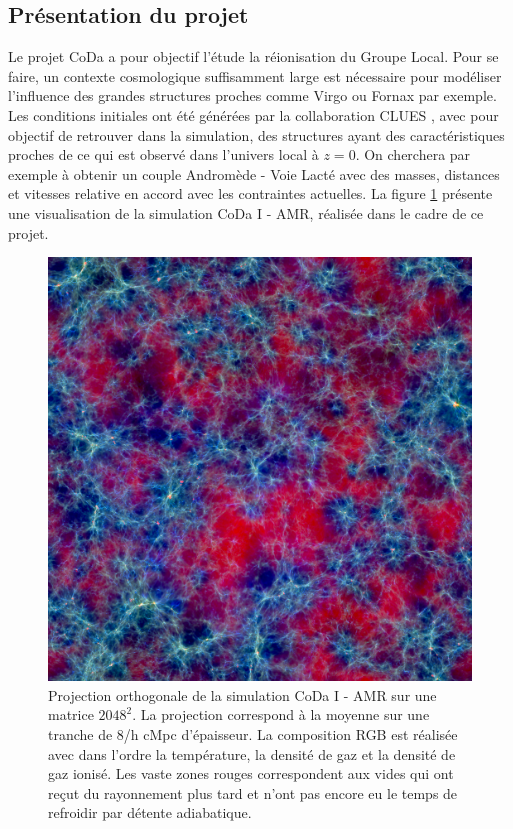 \subsection{Présentation du projet}

Le projet \ac{CoDa} a pour objectif l’étude la réionisation du Groupe Local. %
Pour se faire, un contexte cosmologique suffisamment large est nécessaire pour modéliser l'influence des grandes structures proches comme Virgo ou Fornax par exemple.
Les conditions initiales ont été générées par la collaboration \ac{CLUES} \citep{2010arXiv1005.2687G}, avec pour objectif de retrouver dans la simulation, des structures ayant des caractéristiques proches de ce qui est observé dans l'univers local à $z=0$.
On cherchera par exemple à obtenir un couple Andromède - Voie Lacté avec des masses, distances et vitesses relative en accord avec les contraintes actuelles.
La figure \ref{fig:ortho} présente une visualisation de la simulation CoDa I - AMR, réalisée dans le cadre de ce projet.

\begin{figure}
        \includegraphics[width=.95\textwidth]{img/04/rgb-compose.jpeg} 
        \caption[Projection orthogonale]{Projection orthogonale de la simulation CoDa I - AMR sur une matrice $2048^2$.
        La projection correspond à la moyenne sur une tranche de 8/h cMpc d'épaisseur. 
        La composition RGB est réalisée avec dans l'ordre la température, la densité de gaz et la densité de gaz ionisé.
		Les vaste zones rouges correspondent aux vides qui ont reçut du rayonnement plus tard et n'ont pas encore eu le temps de refroidir par détente adiabatique.  
        }
 		\label{fig:ortho}
\end{figure}


